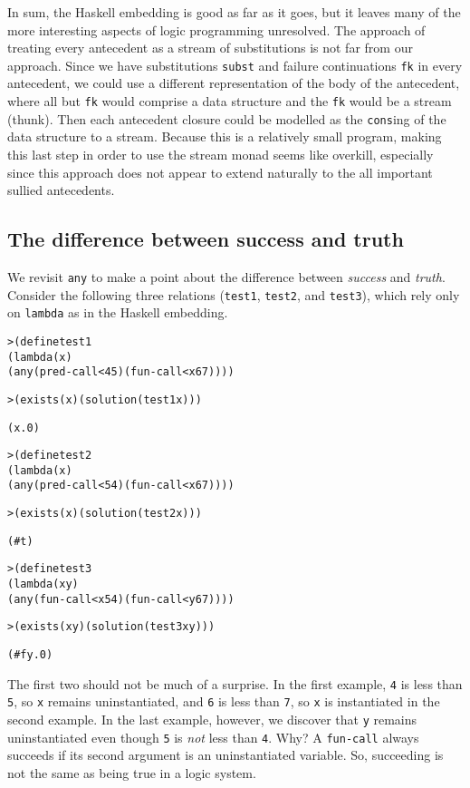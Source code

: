 In sum, the Haskell embedding is good as far as it goes, but it
leaves many of the more interesting aspects of logic programming
unresolved.  The approach of treating every antecedent as a stream
of substitutions is not far from our approach.  Since we have
substitutions \texttt{subst} and failure continuations \texttt{fk}
in every antecedent, we could use a different representation of the
body of the antecedent, where all but \texttt{fk} would comprise
a data structure and the \texttt{fk} would be a stream (thunk).
Then each antecedent closure could be modelled as the \texttt{cons}ing
of the data structure to a stream.  Because this is a relatively
small program, making this last step in order to use the stream
monad seems like overkill, especially since this approach does not
appear to extend naturally to the all important sullied antecedents.

\subsection{The difference between success and truth}

We revisit \texttt{any} to make a point about the difference between
\emph{success} and \emph{truth}.  Consider the following three
relations (\texttt{test1}, \texttt{test2}, and \texttt{test3}), which
rely only on \texttt{lambda} as in the Haskell embedding.

\begin{alltt}
> (define test1
    (lambda (x)
      (any (pred-call < 4 5) (fun-call < x 6 7))))

> (exists (x) (solution (test1 x)))

(x.0)
\end{alltt}
\begin{alltt}
> (define test2
    (lambda (x)
      (any (pred-call < 5 4) (fun-call < x 6 7))))

> (exists (x) (solution (test2 x)))

(#t)
\end{alltt}
\begin{alltt}
> (define test3
    (lambda (x y)
      (any (fun-call < x 5 4) (fun-call < y 6 7))))

> (exists (x y) (solution (test3 x y)))

(#f y.0)
\end{alltt}

The first two should not be much of a surprise.  In the first example,
\texttt{4} is less than \texttt{5}, so \texttt{x} remains uninstantiated,
and \texttt{6} is less than \texttt{7}, so \texttt{x} is instantiated in
the second example.  In the last example, however, we discover that
\texttt{y} remains uninstantiated even though \texttt{5} is \emph{not} less
than \texttt{4}.  Why? A \texttt{fun-call} always succeeds if its second
argument is an uninstantiated variable.  So, succeeding is not the same as
being true in a logic system.

